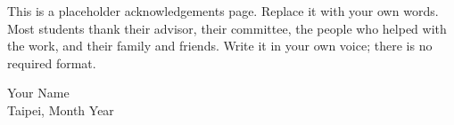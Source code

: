 

	This is a placeholder acknowledgements page. Replace it with your own
	words. Most students thank their advisor, their committee, the people who
	helped with the work, and their family and friends. Write it in your own
	voice; there is no required format.

\vspace{2cm}
\begin{flushright}
Your Name\\
Taipei, Month Year
\end{flushright}
